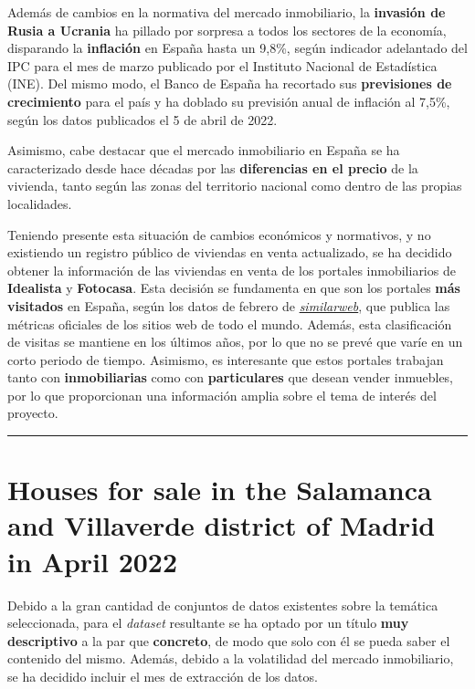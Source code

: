 \documentclass[12pt]{article}
\begin{document}
Además de cambios en la normativa del mercado inmobiliario, la \textbf{invasión de Rusia a Ucrania} ha pillado por sorpresa a todos los sectores de la economía, disparando la \textbf{inflación} en España hasta un 9,8\%, según indicador adelantado del IPC para el mes de marzo publicado por el Instituto Nacional de Estadística (INE). Del mismo modo, el Banco de España ha recortado sus \textbf{previsiones de crecimiento} para el país y ha doblado su previsión anual de inflación al 7,5\%, según los datos publicados el 5 de abril de 2022.

Asimismo, cabe destacar que el mercado inmobiliario en España se ha caracterizado desde hace décadas por las \textbf{diferencias en el precio} de la vivienda, tanto según las zonas del territorio nacional como dentro de las propias localidades. 

Teniendo presente esta situación de cambios económicos y normativos, y no existiendo un registro público de viviendas en venta actualizado, se ha decidido obtener la información de las viviendas en venta de los portales inmobiliarios de \textbf{Idealista} y \textbf{Fotocasa}. Esta decisión se fundamenta en que son los portales \textbf{más visitados} en España, según los datos de febrero de \href{https://www.similarweb.com/top-websites/spain/category/business-and-consumer-services/real-estate/}{\textit{similarweb}}, que publica las métricas oficiales de los sitios web de todo el mundo. Además, esta clasificación de visitas se mantiene en los últimos años, por lo que no se prevé que varíe en un corto periodo de tiempo. Asimismo, es interesante que estos portales trabajan tanto con \textbf{inmobiliarias} como con \textbf{particulares} que desean vender inmuebles, por lo que proporcionan una información amplia sobre el tema de interés del proyecto.

\begin{center}
	\vspace{-0.5cm}
	{\color{uocblue}\rule{0.75\linewidth}{1pt}}
	\vspace{-0.5cm}
\end{center}

\vspace{-1.5em}\section{Houses for sale in the Salamanca and Villaverde district of Madrid in April 2022}\vspace{-1.0em}

Debido a la gran cantidad de conjuntos de datos existentes sobre la temática seleccionada, para el \textit{dataset} resultante se ha optado por un título \textbf{muy descriptivo} a la par que \textbf{concreto}, de modo que solo con él se pueda saber el contenido del mismo. Además, debido a la volatilidad del mercado inmobiliario, se ha decidido incluir el mes de extracción de los datos.
\end{document}
